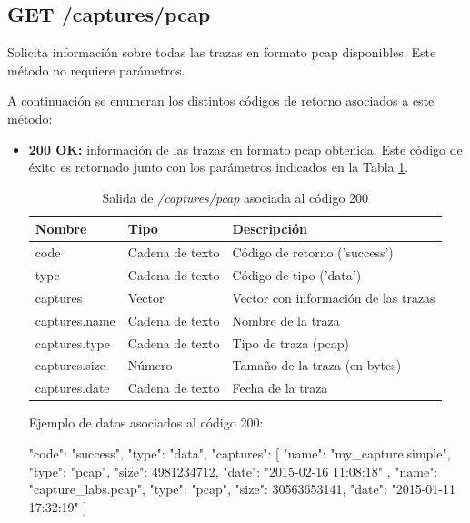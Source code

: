 %
%
\subsection{GET /captures/pcap}
Solicita información sobre todas las \glspl{traza} en formato \gls{pcap} disponibles. Este método no requiere parámetros.

A continuación se enumeran los distintos códigos de retorno asociados a este método:
\begin{itemize}

\item{\textbf{200 OK:} información de las \glspl{traza} en formato \gls{pcap} obtenida. Este código de éxito es retornado junto con los parámetros indicados en la Tabla \ref{extra:api:capturespcap:ok}.
\begin{table}[H]
\centering
\begin{tabular}{|l|l|l|}
\hline
\rowcolor[HTML]{F5F5F5}
\textbf{Nombre}                & \textbf{Tipo}   & \textbf{Descripción}                            \\ \hline
code                           & Cadena de texto & Código de retorno ('success')                   \\ \hline
type                           & Cadena de texto & Código de tipo ('data')                         \\ \hline
captures                       & Vector          & Vector con información de las \glspl{traza}     \\ \hline
captures.name                  & Cadena de texto & Nombre de la \gls{traza}                        \\ \hline
captures.type                  & Cadena de texto & Tipo de \gls{traza} (\gls{pcap})                \\ \hline
captures.size                  & Número          & Tamaño de la \gls{traza} (en bytes)             \\ \hline
captures.date                  & Cadena de texto & Fecha de la \gls{traza}                         \\ \hline
\end{tabular}
\caption{Salida de \textit{/captures/pcap} asociada al código 200}
\label{extra:api:capturespcap:ok}
\end{table}
\begin{minipage}{\textwidth}
Ejemplo de datos asociados al código 200:

\begin{code}[language=json]
{
  "code": "success",
  "type": "data",
  "captures": [
    {
      "name": "my_capture.simple",
      "type": "pcap",
      "size": 4981234712,
      "date": "2015-02-16 11:08:18"
    },
    {
      "name": "capture_labs.pcap",
      "type": "pcap",
      "size": 30563653141,
      "date": "2015-01-11 17:32:19"
    }
  ]
}
\end{code}
\end{minipage}
}

\end{itemize}

